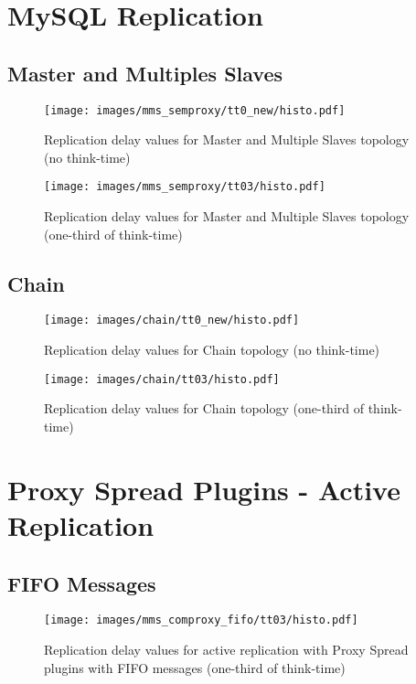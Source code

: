 \section{MySQL Replication}

\subsection{Master and Multiples Slaves}

\begin{figure}[h!]
\centering    
\texttt{[image: images/mms\_semproxy/tt0\_new/histo.pdf]}
\caption{Replication delay values for Master and Multiple Slaves topology (no think-time)}
\end{figure}

\begin{figure}[h!]
\centering    
\texttt{[image: images/mms\_semproxy/tt03/histo.pdf]}
\caption{Replication delay values for Master and Multiple Slaves topology (one-third of think-time)}
\end{figure}

\clearpage

\subsection{Chain}

\begin{figure}[h!]
\centering    
\texttt{[image: images/chain/tt0\_new/histo.pdf]}
\caption{Replication delay values for Chain topology (no think-time)}
\end{figure}

\begin{figure}[h!]
\centering    
\texttt{[image: images/chain/tt03/histo.pdf]}
\caption{Replication delay values for Chain topology (one-third of think-time)}
\end{figure}

\clearpage

\section{Proxy Spread Plugins - Active Replication}

\subsection{FIFO Messages}

\begin{figure}[h!]
\centering    
\texttt{[image: images/mms\_comproxy\_fifo/tt03/histo.pdf]}
\caption{Replication delay values for active replication with Proxy Spread plugins with FIFO messages (one-third of think-time)}
\end{figure}

